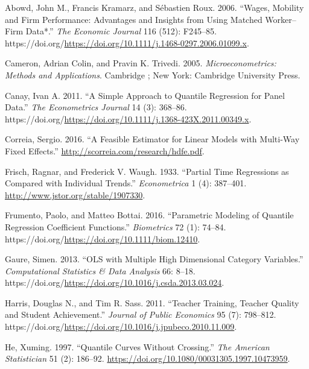 \documentclass[
  letterpaper,
  DIV=11,
  numbers=noendperiod]{scrartcl}
\newlength{\cslhangindent}
\newlength{\cslentryspacingunit} %
\newenvironment{CSLReferences}[2] %
 {%
  \setlength{\parindent}{0pt}
  \ifodd #1
  \let\oldpar\par
  \def\par{\hangindent=\cslhangindent\oldpar}
  \fi
  \setlength{\parskip}{#2\cslentryspacingunit}
 }%
 {}
\begin{document}
\hypertarget{refs}{}
\begin{CSLReferences}{1}{0}
\leavevmode{}%
Abowd, John M., Francis Kramarz, and Sébastien Roux. 2006. {``Wages,
Mobility and Firm Performance: Advantages and Insights from Using
Matched Worker--Firm Data*.''} \emph{The Economic Journal} 116 (512):
F245--85.
https://doi.org/\url{https://doi.org/10.1111/j.1468-0297.2006.01099.x}.

\leavevmode{}%
Cameron, Adrian Colin, and Pravin K. Trivedi. 2005.
\emph{Microeconometrics: Methods and Applications}. Cambridge ; New
York: Cambridge University Press.

\leavevmode{}%
Canay, Ivan A. 2011. {``A Simple Approach to Quantile Regression for
Panel Data.''} \emph{The Econometrics Journal} 14 (3): 368--86.
https://doi.org/\url{https://doi.org/10.1111/j.1368-423X.2011.00349.x}.

\leavevmode{}%
Correia, Sergio. 2016. {``A {Feasible} {Estimator} for {Linear} {Models}
with {Multi}-{Way} {Fixed} {Effects}.''}
\url{http://scorreia.com/research/hdfe.pdf}.

\leavevmode{}%
Frisch, Ragnar, and Frederick V. Waugh. 1933. {``Partial Time
Regressions as Compared with Individual Trends.''} \emph{Econometrica} 1
(4): 387--401. \url{http://www.jstor.org/stable/1907330}.

\leavevmode{}%
Frumento, Paolo, and Matteo Bottai. 2016. {``Parametric Modeling of
Quantile Regression Coefficient Functions.''} \emph{Biometrics} 72 (1):
74--84. https://doi.org/\url{https://doi.org/10.1111/biom.12410}.

\leavevmode{}%
Gaure, Simen. 2013. {``{OLS} with Multiple High Dimensional Category
Variables.''} \emph{Computational Statistics \& Data Analysis} 66:
8--18. https://doi.org/\url{https://doi.org/10.1016/j.csda.2013.03.024}.

\leavevmode{}%
Harris, Douglas N., and Tim R. Sass. 2011. {``Teacher Training, Teacher
Quality and Student Achievement.''} \emph{Journal of Public Economics}
95 (7): 798--812.
https://doi.org/\url{https://doi.org/10.1016/j.jpubeco.2010.11.009}.

\leavevmode{}%
He, Xuming. 1997. {``Quantile Curves Without Crossing.''} \emph{The
American Statistician} 51 (2): 186--92.
\url{https://doi.org/10.1080/00031305.1997.10473959}.


\end{CSLReferences}
\end{document}

